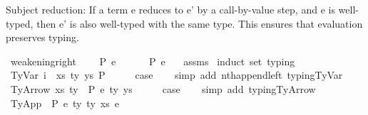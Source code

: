 \begin{isabellebody}
%
\endisadelimdocument
%
\begin{isamarkuptext}%
Subject reduction:
  If a term e reduces to e' by a call-by-value step,
  and e is well-typed,
  then e' is also well-typed with the same type.
  This ensures that evaluation preserves typing.%
\end{isamarkuptext}\isamarkuptrue%
\isamarkupfalse%
\ weakening{\isacharunderscore}{\kern0pt}right{\isacharcolon}{\kern0pt}\isanewline
\ \ \ {\isachardoublequoteopen}{\isasymGamma}\ {\isasymturnstile}{\isacharbraceleft}{\kern0pt}P{\isacharbraceright}{\kern0pt}\ e\ {\isacharcolon}{\kern0pt}\ {\isasymtau}{\isachardoublequoteclose}\isanewline
\ \ \ {\isachardoublequoteopen}{\isasymGamma}{\isacharat}{\kern0pt}{\isasymGamma}{}\ {\isasymturnstile}{\isacharbraceleft}{\kern0pt}P{\isacharbraceright}{\kern0pt}\ e\ {\isacharcolon}{\kern0pt}\ {\isasymtau}{\isachardoublequoteclose}\isanewline
%
\isadelimproof
%
\endisadelimproof
%
\isatagproof
{}\isamarkupfalse%
\ assms\isanewline
{}\isamarkupfalse%
\ {\isacharparenleft}{\kern0pt}induct\ set{\isacharcolon}{\kern0pt}\ typing{\isacharparenright}{\kern0pt}\isanewline
\ \ \isamarkupfalse%
\ {\isacharparenleft}{\kern0pt}TyVar\ i\ {\isasymGamma}\ xs\ ty\ ys\ P{\isacharparenright}{\kern0pt}\isanewline
\ \ \isamarkupfalse%
\ \isamarkupfalse%
\ {\isacharquery}{\kern0pt}case\isanewline
\ \ \isamarkupfalse%
\ {\isacharparenleft}{\kern0pt}simp\ add{\isacharcolon}{\kern0pt}\ nth{\isacharunderscore}{\kern0pt}append{\isacharunderscore}{\kern0pt}left\ typing{\isachardot}{\kern0pt}TyVar{\isacharparenright}{\kern0pt}\isanewline
{}\isamarkupfalse%
\isanewline
\ \ \isamarkupfalse%
\ {\isacharparenleft}{\kern0pt}TyArrow\ xs\ ty{}\ {\isasymGamma}\ P\ e\ ty{}\ ys{\isacharparenright}{\kern0pt}\isanewline
\ \ \isamarkupfalse%
\ \isamarkupfalse%
\ {\isacharquery}{\kern0pt}case\isanewline
\ \ \isamarkupfalse%
\ {\isacharparenleft}{\kern0pt}simp\ add{\isacharcolon}{\kern0pt}\ typing{\isachardot}{\kern0pt}TyArrow{\isacharparenright}{\kern0pt}\isanewline
{}\isamarkupfalse%
\isanewline
\ \ \isamarkupfalse%
\ {\isacharparenleft}{\kern0pt}TyApp\ {\isasymGamma}\ P\ e{}\ ty{}\ ty{}\ xs\ e{}{\isacharparenright}{\kern0pt}\isanewline
\ \ \isamarkupfalse%

\end{isabellebody}
